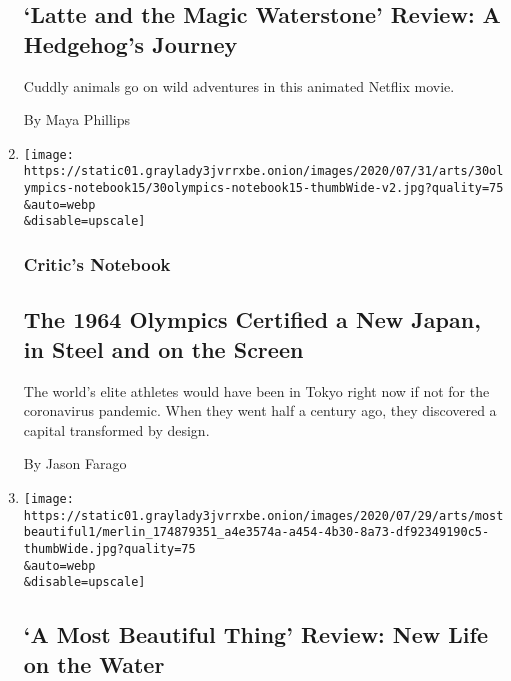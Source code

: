 \begin{enumerate}
  \hypertarget{latte-and-the-magic-waterstone-review-a-hedgehogs-journey}{%
  \subsection{`Latte and the Magic Waterstone' Review: A Hedgehog's
  Journey}\label{latte-and-the-magic-waterstone-review-a-hedgehogs-journey}}

  Cuddly animals go on wild adventures in this animated Netflix movie.

  By Maya Phillips
\item
  \href{/2020/07/30/arts/design/tokyo-olympics-1964-design.html}{}

  \texttt{[image: https://static01.graylady3jvrrxbe.onion/images/2020/07/31/arts/30olympics-notebook15/30olympics-notebook15-thumbWide-v2.jpg?quality=75\\\&auto=webp\\\&disable=upscale]}

  \hypertarget{critics-notebook-1}{%
  \subsubsection{Critic's Notebook}\label{critics-notebook-1}}

  \hypertarget{the-1964-olympics-certified-a-new-japan-in-steel-and-on-the-screen}{%
  \subsection{The 1964 Olympics Certified a New Japan, in Steel and on
  the
  Screen}\label{the-1964-olympics-certified-a-new-japan-in-steel-and-on-the-screen}}

  The world's elite athletes would have been in Tokyo right now if not
  for the coronavirus pandemic. When they went half a century ago, they
  discovered a capital transformed by design.

  By Jason Farago
\item
  \href{/2020/07/30/movies/a-most-beautiful-thing-review.html}{}

  \texttt{[image: https://static01.graylady3jvrrxbe.onion/images/2020/07/29/arts/mostbeautiful1/merlin\_174879351\_a4e3574a-a454-4b30-8a73-df92349190c5-thumbWide.jpg?quality=75\\\&auto=webp\\\&disable=upscale]}

  \hypertarget{a-most-beautiful-thing-review-new-life-on-the-water}{%
  \subsection{`A Most Beautiful Thing' Review: New Life on the
  Water}\label{a-most-beautiful-thing-review-new-life-on-the-water}}


\end{enumerate}
